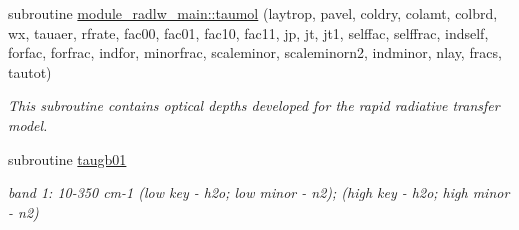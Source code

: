 \begin{DoxyCompactItemize}
subroutine \hyperlink{group__module__radlw__main_gab09f986fb87e796a30c889086c92aeb1}{module\+\_\+radlw\+\_\+main\+::taumol} (laytrop, pavel, coldry, colamt, colbrd, wx, tauaer, rfrate, fac00, fac01, fac10, fac11, jp, jt, jt1, selffac, selffrac, indself, forfac, forfrac, indfor, minorfrac, scaleminor, scaleminorn2, indminor, nlay, fracs, tautot)
\begin{DoxyCompactList}\small\item\em This subroutine contains optical depths developed for the rapid radiative transfer model. \end{DoxyCompactList}\item 
\mbox{\label{group__module__radlw__main_ga001d1bcd17533f7f920f859ff9a4e60f}} 
subroutine \hyperlink{group__module__radlw__main_ga001d1bcd17533f7f920f859ff9a4e60f}{taugb01}
\begin{DoxyCompactList}\small\item\em band 1\+: 10-\/350 cm-\/1 (low key -\/ h2o; low minor -\/ n2); (high key -\/ h2o; high minor -\/ n2) \end{DoxyCompactList}\end{DoxyCompactItemize}
